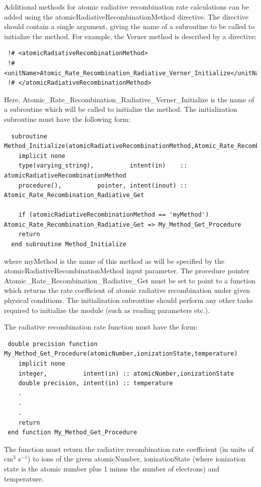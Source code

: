 Additional methods for atomic radiative recombination rate calculations can be added using the {\normalfont \ttfamily atomicRadiativeRecombinationMethod} directive. The directive should contain a single argument, giving the name of a subroutine to be called to initialize the method. For example, the {\normalfont \ttfamily Verner} method is described by a directive:
\begin{verbatim}
 !# <atomicRadiativeRecombinationMethod>
 !#  <unitName>Atomic_Rate_Recombination_Radiative_Verner_Initialize</unitName>
 !# </atomicRadiativeRecombinationMethod>
\end{verbatim}
Here, {\normalfont \ttfamily Atomic\_Rate\_Recombination\_Radiative\_Verner\_Initialize} is the name of a subroutine which will be called to initialize the method. The initialization subroutine must have the following form:
\begin{verbatim}
  subroutine Method_Initialize(atomicRadiativeRecombinationMethod,Atomic_Rate_Recombination_Radiative_Get)
    implicit none
    type(varying_string),          intent(in)    :: atomicRadiativeRecombinationMethod
    procedure(),          pointer, intent(inout) :: Atomic_Rate_Recombination_Radiative_Get
    
    if (atomicRadiativeRecombinationMethod == 'myMethod') Atomic_Rate_Recombination_Radiative_Get => My_Method_Get_Procedure
    return
  end subroutine Method_Initialize
\end{verbatim}
where {\normalfont \ttfamily myMethod} is the name of this method as will be specified by the {\normalfont \ttfamily atomicRadiativeRecombinationMethod} input parameter. The procedure pointer {\normalfont \ttfamily Atomic\_Rate\_Recombination\_Radiative\_Get} must be set to point to a function which returns the rate coefficient of atomic radiative recombination under given physical conditions. The initialization subroutine should perform any other tasks required to initialize the module (such as reading parameters etc.).

The radiative recombination rate function must have the form:
\begin{verbatim}
 double precision function My_Method_Get_Procedure(atomicNumber,ionizationState,temperature)
    implicit none
    integer,          intent(in) :: atomicNumber,ionizationState
    double precision, intent(in) :: temperature
    .
    .
    .
    return
 end function My_Method_Get_Procedure
\end{verbatim}
The function must return the radiative recombination rate coefficient (in units of cm$^3$ s$^{-1}$) to ions of the given {\normalfont \ttfamily atomicNumber}, {\normalfont \ttfamily ionizationState} (where ionization state is the atomic number plus 1 minus the number of electrons) and {\normalfont \ttfamily temperature}.

